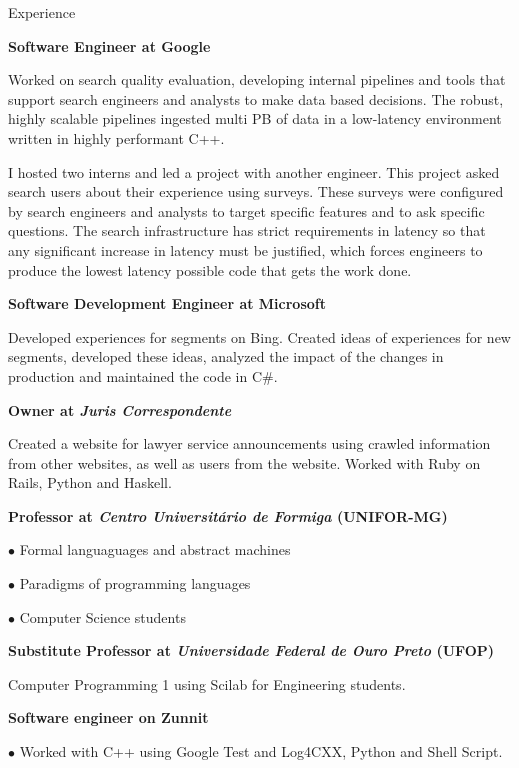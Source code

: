 \begin {rubric} {Experience}

\entry* [11/2014-\ldots]
\textbf {Software Engineer at Google}

Worked on search quality evaluation, developing internal pipelines and
tools that support search engineers and analysts to make data based
decisions. The robust, highly scalable pipelines ingested multi PB of
data in a low-latency environment written in highly performant C++.

I hosted two interns and led a project with another engineer. This
project asked search users about their experience using surveys. These
surveys were configured by search engineers and analysts to target
specific features and to ask specific questions. The search
infrastructure has strict requirements in latency so that any
significant increase in latency must be justified, which forces
engineers to produce the lowest latency possible code that gets the
work done.


\entry* [12/2012-09/2014]
\textbf {Software Development Engineer at Microsoft}

Developed experiences for segments on Bing.  Created ideas of
experiences for new segments, developed these ideas, analyzed the
impact of the changes in production and maintained the code in C\#.

\entry* [08/2012-05/2014]
\textbf {Owner at \emph{Juris Correspondente}}

Created a website for lawyer service announcements using crawled
information from other websites, as well as users from the
website. Worked with Ruby on Rails, Python and Haskell.

\entry* [10/2012-12/2012]
\textbf {Professor at \emph{Centro Universitário de Formiga} (UNIFOR-MG)}

$\bullet$ Formal languaguages and abstract machines

$\bullet$ Paradigms of programming languages

$\bullet$ Computer Science students

\entry* [02/2012-11/2012]
\textbf {Substitute Professor at \emph{Universidade Federal de Ouro Preto} (UFOP)}

Computer Programming 1 using Scilab for Engineering students.

\entry* [06/2011-03/2012]
\textbf {Software engineer on Zunnit}

$\bullet$ Worked with C++ using Google Test and Log4CXX, Python and Shell Script.


\end{rubric}
